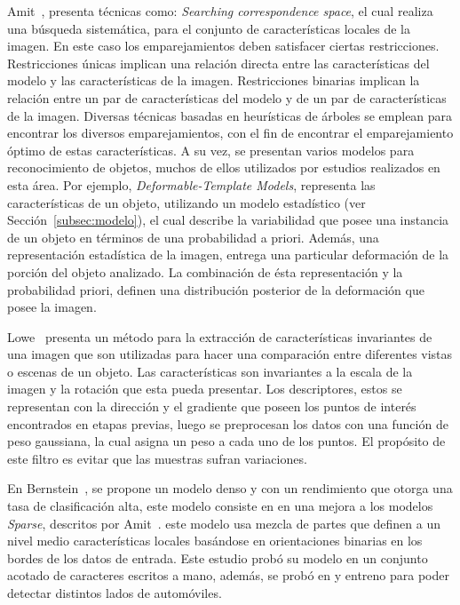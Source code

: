 Amit~\cite{Amit2002}, presenta técnicas como: \textit{Searching correspondence space}, el cual realiza una búsqueda sistemática, para el conjunto de características locales de la imagen. En este caso los emparejamientos deben satisfacer ciertas restricciones. Restricciones únicas implican una relación directa entre las características del modelo y las características de la imagen. Restricciones binarias implican la relación entre un par de características del modelo y de un par de características de la imagen. Diversas técnicas basadas en heurísticas de árboles se emplean para encontrar los diversos emparejamientos, con el fin de encontrar el emparejamiento óptimo de estas características. A su vez, se presentan varios modelos para reconocimiento de objetos, muchos de ellos utilizados por estudios realizados en esta área. Por ejemplo, \textit{Deformable-Template Models}, representa las características de un objeto, utilizando un modelo estadístico (ver Sección~\ref{subsec:modelo}), el cual describe la variabilidad que posee una instancia de un objeto en términos de una probabilidad a priori. Además, una representación  estadística de la imagen, entrega una particular deformación de la porción del objeto analizado. La combinación de ésta representación y la probabilidad priori, definen una distribución posterior de la deformación que posee la imagen.

Lowe~\cite{sift2004} presenta un método para la extracción de características invariantes de una imagen que son utilizadas para hacer una comparación entre diferentes vistas o escenas de un objeto. Las características son invariantes a la escala de la imagen y la rotación que esta pueda presentar. Los descriptores, estos se representan con la dirección y el gradiente que poseen los puntos de interés encontrados en etapas previas, luego se preprocesan los datos con una función de peso gaussiana, la cual asigna un peso a cada uno de los puntos. El propósito de este filtro es evitar que las muestras sufran variaciones.

En Bernstein~\cite{statistical2005}, se propone un modelo denso y con un rendimiento que otorga una tasa de clasificación alta, este modelo consiste en en una mejora a los modelos \textit{Sparse}, descritos por Amit~\cite{Amit2002}. este modelo usa mezcla de partes que definen a un nivel medio características locales basándose en orientaciones binarias en los bordes de los datos de entrada. Este estudio probó su modelo en un conjunto acotado de caracteres escritos a mano, además, se probó en y entreno para poder detectar distintos lados de automóviles.

